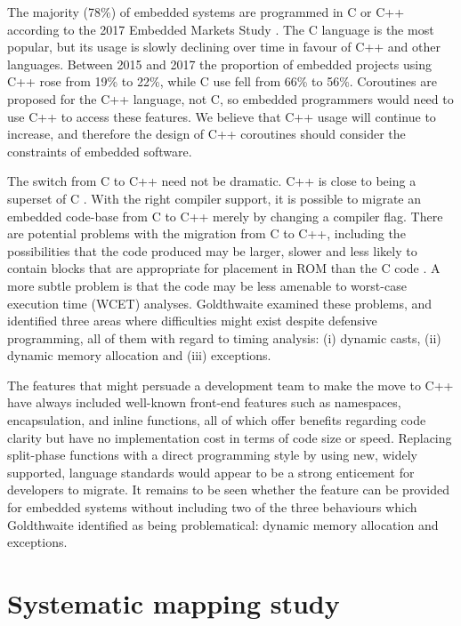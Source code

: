 \documentclass[format=acmsmall, review=false, screen=false]{acmart}
\begin{document}
The majority (78\%) of embedded systems are programmed in C or C++ according to the 2017 Embedded Markets Study \cite{AspenCore2017}. The C language is the most popular, but its usage is slowly declining over time in favour of C++ and other languages. Between 2015 and 2017 the proportion of embedded projects using C++ rose from 19\% to 22\%, while C use fell from 66\% to 56\%. Coroutines are proposed for the C++ language, not C, so embedded programmers would need to use C++ to access these features. We believe that C++ usage will continue to increase, and therefore the design of C++ coroutines should consider the constraints of embedded software.  

The switch from C to C++ need not be dramatic. C++ is close to being a superset of C \cite{Stroustrup1986}. With the right compiler support, it is possible to migrate an embedded code-base from C to C++ merely by changing a compiler flag. There are potential problems with the migration from C to C++, including the possibilities that the code produced may be larger, slower and less likely to contain blocks that are appropriate for placement in ROM than the C code \cite{Goldthwaite2006, Herity2015}. A more subtle problem is that the code may be less amenable to worst-case execution time (WCET) analyses. Goldthwaite \cite{Goldthwaite2006} examined these problems, and identified three areas where difficulties might exist despite defensive programming, all of them with regard to timing analysis: (i) dynamic casts, (ii) dynamic memory allocation and (iii) exceptions.

The features that might persuade a development team to make the move to C++ have always included well-known front-end features such as namespaces, encapsulation, and inline functions, all of which offer benefits regarding code clarity but have no implementation cost in terms of code size or speed. Replacing split-phase functions with a direct programming style by using new, widely supported, language standards would appear to be a strong enticement for developers to migrate. It remains to be seen whether the feature can be provided for embedded systems without including two of the three behaviours which Goldthwaite \cite{Goldthwaite2006} identified as being problematical: dynamic memory allocation and exceptions.

\section{Systematic mapping study}
\label{section:sms}
\end{document}
